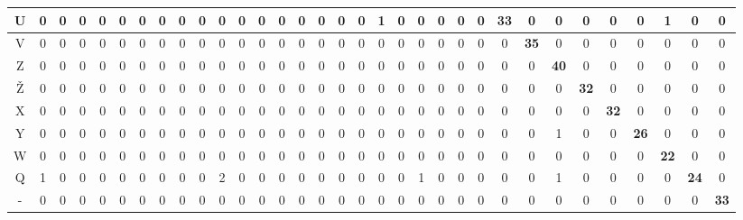 \begin{table}[]
{\begin{tabular}{|c|c|c|c|c|c|c|c|c|c|c|c|c|c|c|c|c|c|c|c|c|c|c|c|c|c|c|c|c|c|c|c|c|}
U & 0 & 0 & 0 & 0 & 0 & 0 & 0 & 0 & 0 & 0 & 0 & 0 & 0 & 0 & 0 & 0 & 0 & 1 & 0 & 0 & 0 & 0 & 0 & \textbf{33} & 0 & 0 & 0 & 0 & 0 & 1 & 0 & 0           \\ \hline
V & 0 & 0 & 0 & 0 & 0 & 0 & 0 & 0 & 0 & 0 & 0 & 0 & 0 & 0 & 0 & 0 & 0 & 0 & 0 & 0 & 0 & 0 & 0 & 0 & \textbf{35} & 0 & 0 & 0 & 0 & 0 & 0 & 0           \\ \hline \rowcolor{gray1}
Z & 0 & 0 & 0 & 0 & 0 & 0 & 0 & 0 & 0 & 0 & 0 & 0 & 0 & 0 & 0 & 0 & 0 & 0 & 0 & 0 & 0 & 0 & 0 & 0 & 0 & \textbf{40} & 0 & 0 & 0 & 0 & 0 & 0           \\ \hline
Ž & 0 & 0 & 0 & 0 & 0 & 0 & 0 & 0 & 0 & 0 & 0 & 0 & 0 & 0 & 0 & 0 & 0 & 0 & 0 & 0 & 0 & 0 & 0 & 0 & 0 & 0 & \textbf{32} & 0 & 0 & 0 & 0 & 0           \\ \hline \rowcolor{gray1}
X & 0 & 0 & 0 & 0 & 0 & 0 & 0 & 0 & 0 & 0 & 0 & 0 & 0 & 0 & 0 & 0 & 0 & 0 & 0 & 0 & 0 & 0 & 0 & 0 & 0 & 0 & 0 & \textbf{32} & 0 & 0 & 0 & 0           \\ \hline
Y & 0 & 0 & 0 & 0 & 0 & 0 & 0 & 0 & 0 & 0 & 0 & 0 & 0 & 0 & 0 & 0 & 0 & 0 & 0 & 0 & 0 & 0 & 0 & 0 & 0 & 1 & 0 & 0 & \textbf{26} & 0 & 0 & 0           \\ \hline \rowcolor{gray1}
W & 0 & 0 & 0 & 0 & 0 & 0 & 0 & 0 & 0 & 0 & 0 & 0 & 0 & 0 & 0 & 0 & 0 & 0 & 0 & 0 & 0 & 0 & 0 & 0 & 0 & 0 & 0 & 0 & 0 & \textbf{22} & 0 & 0           \\ \hline
Q & 1 & 0 & 0 & 0 & 0 & 0 & 0 & 0 & 0 & 2 & 0 & 0 & 0 & 0 & 0 & 0 & 0 & 0 & 0 & 1 & 0 & 0 & 0 & 0 & 0 & 1 & 0 & 0 & 0 & 0 & \textbf{24} & 0           \\ \hline \rowcolor{gray1}
- & 0 & 0 & 0 & 0 & 0 & 0 & 0 & 0 & 0 & 0 & 0 & 0 & 0 & 0 & 0 & 0 & 0 & 0 & 0 & 0 & 0 & 0 & 0 & 0 & 0 & 0 & 0 & 0 & 0 & 0 & 0 & \textbf{33} \\ \hline
\end{tabular}
}
\end{table}
